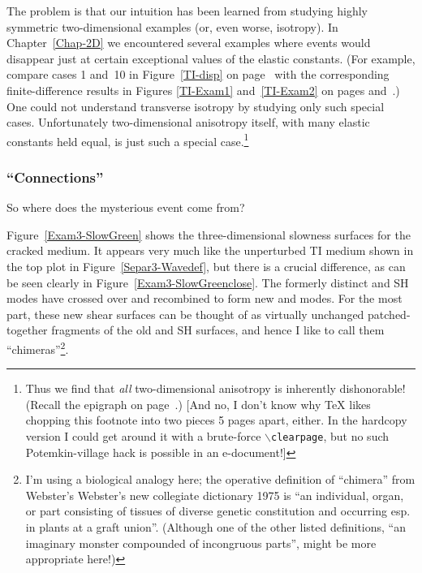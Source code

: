 The problem is that our intuition has been learned from
studying highly symmetric two-dimensional examples
(or, even worse, isotropy).
In Chapter~\ref{Chap-2D} we encountered several examples
where events would disappear just at certain exceptional values
of the elastic constants.
(For example, compare cases 1 and~10 in Figure~\ref{TI-disp} on
page~\pageref{TI-disp} with the corresponding finite-difference
results in Figures \ref{TI-Exam1} and~\ref{TI-Exam2}
on pages \pageref{TI-Exam1} and~\pageref{TI-Exam2}.)
One could not understand transverse isotropy by studying only such
special cases.
Unfortunately two-dimensional anisotropy itself,
with many elastic constants held equal,
is just such a special case.\footnote{
Thus we find that
{\em all\/} two-dimensional anisotropy is inherently dishonorable!
(Recall the epigraph on page~\pageref{Quote-Helbig}.)
[And no, I don't know why {\TeX} likes chopping this footnote into two
pieces 5 pages apart, either. In the hardcopy version I could get around
it with a brute-force {\tt {$\backslash$}clearpage},
but no such Potemkin-village hack is possible in an e-document!]
}

\subsubsection{``Connections''}
So where does the mysterious event come from?

Figure~\ref{Exam3-SlowGreen} shows the three-dimensional slowness
surfaces for the cracked medium. It appears very much like the unperturbed
TI medium shown in the top plot in Figure~\ref{Separ3-Wavedef},
but there is a crucial difference, as can be seen clearly
in Figure~\ref{Exam3-SlowGreenclose}. The formerly distinct
{\qSV} and SH modes have crossed over and recombined to form
\label{Exam3-Chimera}
new {} and {} modes.
For the most part, these new shear surfaces can be thought of as
virtually unchanged patched-together fragments
of the old {\qSV} and SH surfaces, and hence I like to call them
``chimeras''\footnote{I'm using a biological analogy here;
the operative definition of ``chimera'' from Webster's
{Webster's new collegiate dictionary}
{1975}
is
``an individual, organ, or part consisting of tissues of diverse genetic
constitution and occurring esp. in plants at a graft union''.
(Although one of the other listed definitions,
``an imaginary monster compounded of incongruous parts'',
might be more appropriate here!)
}.


